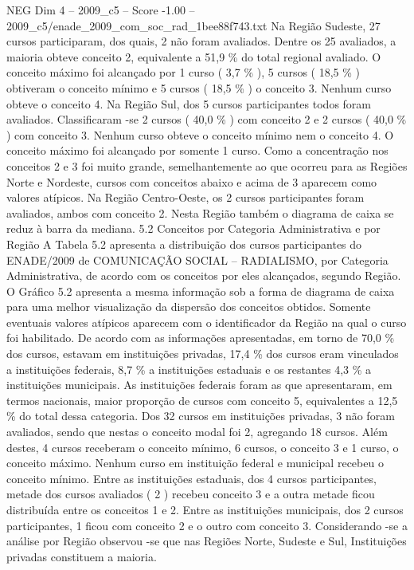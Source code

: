 \begin{textsample}{NEG Dim 4 – 2009\_c5 – Score -1.00 – 2009\_c5/enade\_2009\_com\_soc\_rad\_1bee88f743.txt}
Na Região Sudeste, 27 cursos participaram, dos quais, 2 não foram avaliados.
Dentre os 25 avaliados, a maioria obteve conceito 2, equivalente a 51,9 \% do total regional avaliado.
O conceito máximo foi alcançado por 1 curso ( 3,7 \% ), 5 cursos ( 18,5 \% ) obtiveram o conceito mínimo e 5 cursos ( 18,5 \% ) o conceito 3.
Nenhum curso obteve o conceito 4.
Na Região Sul, dos 5 cursos participantes todos foram avaliados.
Classificaram -se 2 cursos ( 40,0 \% ) com conceito 2 e 2 cursos ( 40,0 \% ) com conceito 3.
Nenhum curso obteve o conceito mínimo nem o conceito 4.
O conceito máximo foi alcançado por somente 1 curso.
Como a concentração nos conceitos 2 e 3 foi muito grande, semelhantemente ao que ocorreu para as Regiões Norte e Nordeste, cursos com conceitos abaixo e acima de 3 aparecem como valores atípicos.
Na Região Centro-Oeste, os 2 cursos participantes foram avaliados, ambos com conceito 2.
Nesta Região também o diagrama de caixa se reduz à barra da mediana. 5.2 Conceitos por Categoria Administrativa e por Região A Tabela 5.2 apresenta a distribuição dos cursos participantes do ENADE/2009 de COMUNICAÇÃO SOCIAL – RADIALISMO, por Categoria Administrativa, de acordo com os conceitos por eles alcançados, segundo Região.
O Gráfico 5.2 apresenta a mesma informação sob a forma de diagrama de caixa para uma melhor visualização da dispersão dos conceitos obtidos.
Somente eventuais valores atípicos aparecem com o identificador da Região na qual o curso foi habilitado.
De acordo com as informações apresentadas, em torno de 70,0 \% dos cursos, estavam em instituições privadas, 17,4 \% dos cursos eram vinculados a instituições federais, 8,7 \% a instituições estaduais e os restantes 4,3 \% a instituições municipais.
As instituições federais foram as que apresentaram, em termos nacionais, maior proporção de cursos com conceito 5, equivalentes a 12,5 \% do total dessa categoria.
Dos 32 cursos em instituições privadas, 3 não foram avaliados, sendo que nestas o conceito modal foi 2, agregando 18 cursos.
Além destes, 4 cursos receberam o conceito mínimo, 6 cursos, o conceito 3 e 1 curso, o conceito máximo.
Nenhum curso em instituição federal e municipal recebeu o conceito mínimo.
Entre as instituições estaduais, dos 4 cursos participantes, metade dos cursos avaliados ( 2 ) recebeu conceito 3 e a outra metade ficou distribuída entre os conceitos 1 e 2.
Entre as instituições municipais, dos 2 cursos participantes, 1 ficou com conceito 2 e o outro com conceito 3.
Considerando -se a análise por Região observou -se que nas Regiões Norte, Sudeste e Sul, Instituições privadas constituem a maioria.

\end{textsample}
